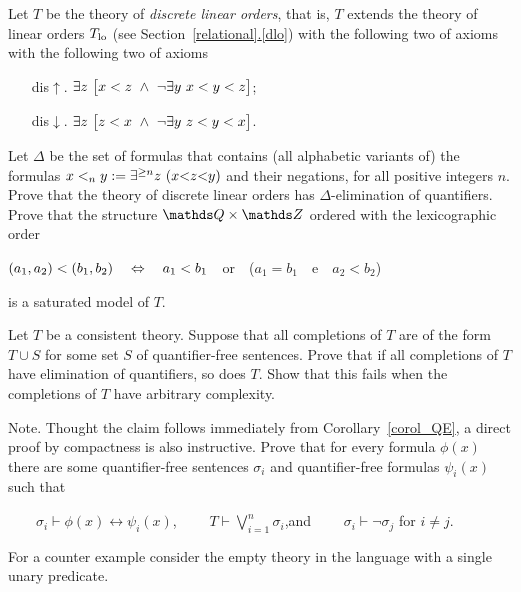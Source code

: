 \begin{exercise}\label{ex_discrete_lo}
Let $T$ be the theory of \emph{discrete linear orders}, that is, $T$ extends the theory of linear orders $T_{\rm lo}$  (see Section~\hyperref[dlo]{\ref*{relational}.\ref*{dlo}}) with the following two of axioms with the following two of axioms
\begin{itemize}
\item[dis$\uparrow$.] $\E z\ \big[x<z\ \wedge\ \neg\E y\ x<y<z\big]$;
\item[dis$\downarrow$.] $\E z\ \big[ z<x\ \wedge\ \neg\E y\ z<y<x\big]$.
\end{itemize}
Let $\Delta$ be the set of formulas that contains (all alphabetic variants of) the formulas $x<_ny:=\E^{\ge n}z\ (x\mathord<z\mathord< y)$ and their negations, for all positive integers $n$. Prove that the theory of discrete linear orders has $\Delta$-elimination of quantifiers. Prove that the structure $\QQ\times\ZZ$ ordered with the lexicographic order 

\hfil$(a_1,a_2)<(b_1,b_2)\quad\Leftrightarrow\quad a_1<b_1$\ \ or\ \ ($a_1=b_1$\ \ e\ \ $a_2<b_2$)

is a saturated model of $T$.\QED
\end{exercise}



\begin{exercise}
Let $T$ be a consistent theory. Suppose that all completions of $T$ are of the form 
$T\cup S$ for some set $S$ of quantifier-free sentences. Prove that if all completions of $T$ have elimination of quantifiers, so does $T$. Show that this fails when the completions of $T$ have arbitrary complexity. 

Note. Thought the claim follows immediately from Corollary~\ref{corol_QE}, a direct proof by compactness is also instructive. Prove that for every formula $\phi(x)$ there are some quantifier-free sentences $\sigma_i$ and quantifier-free formulas $\psi_i(x)$ such that

$\displaystyle\qquad\sigma_i\vdash\phi(x)\leftrightarrow\psi_i(x)$, 
$\qquad\displaystyle T\vdash\bigvee^n_{i=1}\sigma_i$,\qquad and  $\qquad\sigma_i\vdash\neg\sigma_j$ for $i\neq j$.

For a counter example consider the empty theory in the language with a single unary predicate.\QED
\end{exercise}



